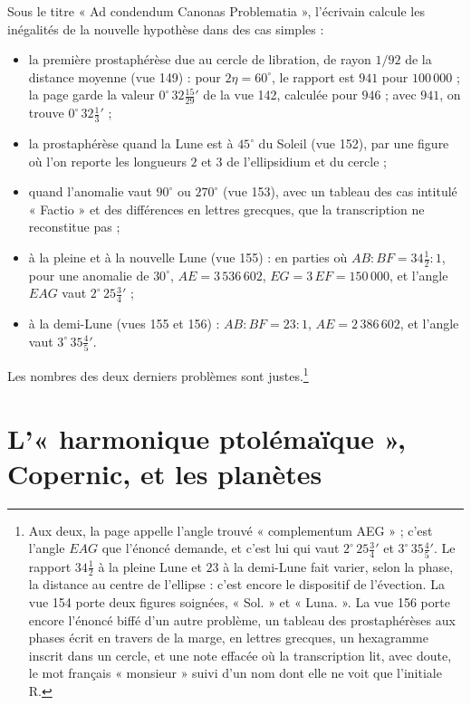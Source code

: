 \documentclass[11pt,a4paper]{article}
\begin{document}
Sous le titre « Ad condendum Canonas Problematia », l'écrivain calcule les
inégalités de la nouvelle hypothèse dans des cas simples :
\begin{itemize}
  \item la première prostaphérèse due au cercle de libration, de rayon
    $1/92$ de la distance moyenne (vue 149) : pour $2\eta = 60^\circ$, le rapport est
    $941$ pour $100\,000$ ; la page garde la valeur $0^\circ\,32\tfrac{15}{29}'$ de la
    vue 142, calculée pour $946$ ; avec $941$, on trouve $0^\circ\,32\tfrac13'$ ;
  \item la prostaphérèse quand la Lune est à $45^\circ$ du Soleil (vue 152), par une
    figure où l'on reporte les longueurs $2$ et $3$ de l'ellipsidium et du
    cercle ;
  \item quand l'anomalie vaut $90^\circ$ ou $270^\circ$ (vue 153), avec un tableau
    des cas intitulé « Factio » et des différences en lettres grecques, que la
    transcription ne reconstitue pas ;
  \item à la pleine et à la nouvelle Lune (vue 155) : en parties où
    $AB : BF = 34\tfrac12 : 1$, pour une anomalie de $30^\circ$, $AE = 3\,536\,602$,
    $EG = 3\,EF = 150\,000$, et l'angle $EAG$ vaut $2^\circ\,25\tfrac34'$ ;
  \item à la demi-Lune (vues 155 et 156) : $AB : BF = 23 : 1$, $AE = 2\,386\,602$,
    et l'angle vaut $3^\circ\,35\tfrac45'$.
\end{itemize}
Les nombres des deux derniers problèmes sont justes.\footnote{Aux deux, la page
appelle l'angle trouvé « complementum AEG » ; c'est l'angle $EAG$ que l'énoncé
demande, et c'est lui qui vaut $2^\circ\,25\tfrac34'$ et $3^\circ\,35\tfrac45'$. Le
rapport $34\tfrac12$ à la pleine Lune et $23$ à la demi-Lune fait varier, selon la
phase, la distance au centre de l'ellipse : c'est encore le dispositif de
l'évection. La vue 154 porte deux figures soignées, « Sol. » et « Luna. ». La vue
156 porte encore l'énoncé biffé d'un autre problème, un tableau des
prostaphérèses aux phases écrit en travers de la marge, en lettres grecques, un
hexagramme inscrit dans un cercle, et une note effacée où la transcription lit,
avec doute, le mot français « monsieur » suivi d'un nom dont elle ne voit que
l'initiale R.}

\section*{L'« harmonique ptolémaïque », Copernic, et les planètes}
\end{document}
